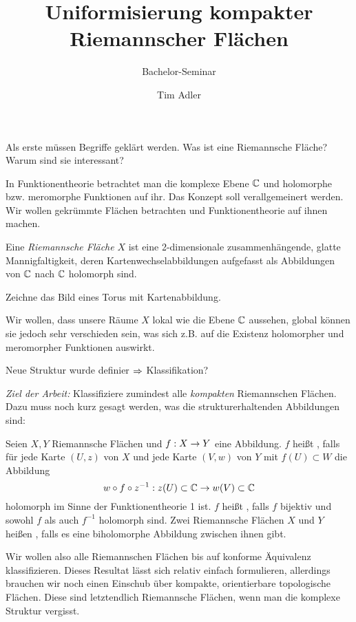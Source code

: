 

\title{Uniformisierung kompakter Riemannscher Flächen}
\subtitle{Bachelor-Seminar}
\author{Tim Adler}



\maketitle

Als erste müssen Begriffe geklärt werden. Was ist eine Riemannsche
Fläche? Warum sind sie interessant?

In Funktionentheorie betrachtet man die komplexe Ebene $\mathbb{C}$ und
holomorphe bzw. meromorphe Funktionen auf ihr. Das Konzept soll
verallgemeinert werden. Wir wollen gekrümmte Flächen betrachten und
Funktionentheorie auf ihnen machen.

\begin{defin}
  \label{def:rf}
  Eine \emph{Riemannsche Fläche} $X$ ist eine 2-dimensionale
  zusammenhängende, glatte Mannigfaltigkeit, deren
  Kartenwechselabbildungen aufgefasst als Abbildungen von $\mathbb{C}$ nach
  $\mathbb{C}$ holomorph sind.
\end{defin}

Zeichne das Bild eines Torus mit Kartenabbildung.

Wir wollen, dass unsere Räume $X$ lokal wie die Ebene $\mathbb{C}$ aussehen,
global können sie jedoch sehr verschieden sein, was sich z.B. auf die
Existenz holomorpher und meromorpher Funktionen auswirkt.

Neue Struktur wurde definier $\Rightarrow$ Klassifikation? 

\emph{Ziel der Arbeit:} Klassifiziere zumindest alle \emph{kompakten}
Riemannschen Flächen. Dazu muss noch kurz gesagt werden, was die
strukturerhaltenden Abbildungen sind:

\begin{defin}
  Seien $X,Y$ Riemannsche Flächen und $f: X \rightarrow Y$ eine Abbildung. $f$
  heißt , falls für jede Karte $(U,z)$ von $X$ und
  jede Karte $(V, w)$ von $Y$ mit $f(U) \subset W$ die Abbildung
  \[
  w \circ f \circ z^{-1} : z(U) \subset \mathbb{C} \rightarrow w(V) \subset \mathbb{C}
  \]
  holomorph im Sinne der Funktionentheorie 1 ist. $f$ heißt
  , falls $f$ bijektiv und sowohl $f$ als auch $f^{-1}$
  holomorph sind. Zwei Riemannsche Flächen $X$ und $Y$ heißen , falls es eine biholomorphe Abbildung zwischen ihnen gibt.
\end{defin}

Wir wollen also alle Riemannschen Flächen bis auf konforme Äquivalenz
klassifizieren. Dieses Resultat lässt sich relativ einfach
formulieren, allerdings brauchen wir noch einen Einschub über
kompakte, orientierbare topologische Flächen. Diese sind letztendlich
Riemannsche Flächen, wenn man die komplexe Struktur vergisst.

